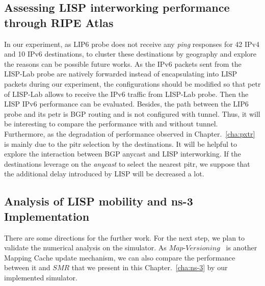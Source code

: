 \subsection{Assessing LISP interworking performance through RIPE Atlas}
In our experiment, as LIP6 probe does not receive any \emph{ping} responses for 42 IPv4 and 10 IPv6 destinations, to cluster these destinations by geography and explore the reasons can be possible future works. As the IPv6 packets sent from the LISP-Lab probe are natively forwarded instead of encapsulating into LISP packets during our experiment, the configurations should be modified so that \acrshort{petr} of LISP-Lab allows to receive the IPv6 traffic from LISP-Lab probe. Then the LISP IPv6 performance can be evaluated. Besides, the path between the LIP6 probe and its \acrshort{petr} is BGP routing and is not configured with tunnel. Thus, it will be interesting to compare the performance with and without tunnel. Furthermore, as the degradation of performance observed in Chapter.~\ref{cha:pxtr} is mainly due to the \acrshort{pitr} selection by the destinations. It will be helpful to explore the interaction between BGP anycast and LISP interworking. If the destinations leverage on the \emph{anycast} to select the nearest \acrshort{pitr}, we suppose that the additional delay introduced by LISP will be decreased a lot.

\subsection{Analysis of LISP mobility and ns-3 Implementation}
There are some directions for the further work. For the next step, we plan to validate the numerical analysis on the simulator. As $Map\textbf{-}Versioning$~\cite{rfc6834} is another Mapping Cache update mechanism, we can also compare the performance between it and $SMR$ that we present in this Chapter.~\ref{cha:ns-3} by our implemented simulator. 

